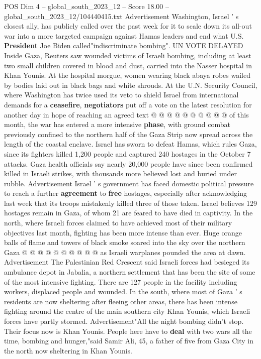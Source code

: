 \begin{textsample}{POS Dim 4 – global\_south\_2023\_12 – Score 18.00 – global\_south\_2023\_12/104440415.txt}
Advertisement Washington, Israel ' s closest ally, has publicly called over the past week for it to scale down its all-out war into a more targeted campaign against Hamas leaders and end what U.S. \textbf{President} Joe Biden called"indiscriminate bombing".
UN VOTE DELAYED Inside Gaza, Reuters saw wounded victims of Israeli bombing, including at least two small children covered in blood and dust, carried into the Nasser hospital in Khan Younis.
At the hospital morgue, women wearing black abaya robes wailed by bodies laid out in black bags and white shrouds.
At the U.N.
Security Council, where Washington has twice used its veto to shield Israel from international demands for a \textbf{ceasefire}, \textbf{negotiators} put off a vote on the latest resolution for another day in hope of reaching an agreed text @ @ @ @ @ @ @ @ @ @ of this month, the war has entered a more intensive \textbf{phase}, with ground combat previously confined to the northern half of the Gaza Strip now spread across the length of the coastal enclave.
Israel has sworn to defeat Hamas, which rules Gaza, since its fighters killed 1,200 people and captured 240 hostages in the October 7 attacks.
Gaza health officials say nearly 20,000 people have since been confirmed killed in Israeli strikes, with thousands more believed lost and buried under rubble.
Advertisement Israel ' s government has faced domestic political pressure to reach a further \textbf{agreement} to \textbf{free} hostages, especially after acknowledging last week that its troops mistakenly killed three of those taken.
Israel believes 129 hostages remain in Gaza, of whom 21 are feared to have died in captivity.
In the north, where Israeli forces claimed to have achieved most of their military objectives last month, fighting has been more intense than ever.
Huge orange balls of flame and towers of black smoke soared into the sky over the northern Gaza @ @ @ @ @ @ @ @ @ @ as Israeli warplanes pounded the area at dawn.
Advertisement The Palestinian Red Crescent said Israeli forces had besieged its ambulance depot in Jabalia, a northern settlement that has been the site of some of the most intensive fighting.
There are 127 people in the facility including workers, displaced people and wounded.
In the south, where most of Gaza ' s residents are now sheltering after fleeing other areas, there has been intense fighting around the centre of the main southern city Khan Younis, which Israeli forces have partly stormed.
Advertisement"All the night bombing didn't stop.
Their focus now is Khan Younis.
People here have to \textbf{deal} with two wars all the time, bombing and hunger,"said Samir Ali, 45, a father of five from Gaza City in the north now sheltering in Khan Younis.

\end{textsample}
